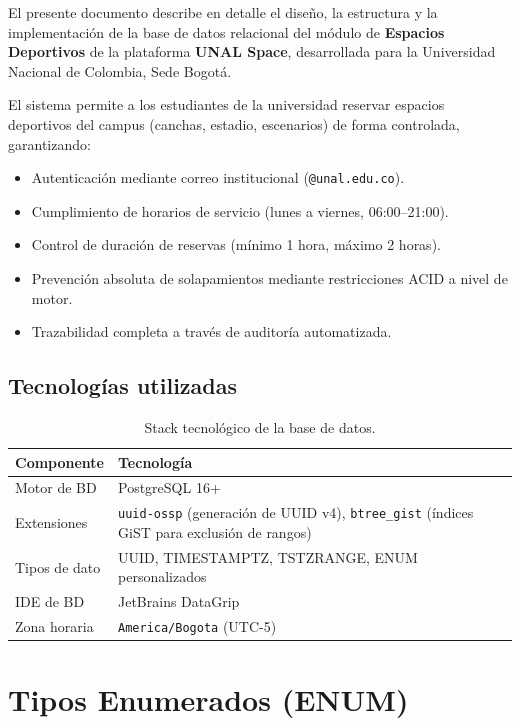 \documentclass[12pt, a4paper]{article}
\begin{document}
El presente documento describe en detalle el diseño, la estructura y la implementación de la base de datos relacional del módulo de \textbf{Espacios Deportivos} de la plataforma \textbf{UNAL Space}, desarrollada para la Universidad Nacional de Colombia, Sede Bogotá.

El sistema permite a los estudiantes de la universidad reservar espacios deportivos del campus (canchas, estadio, escenarios) de forma controlada, garantizando:

\begin{itemize}[leftmargin=2em]
    \item Autenticación mediante correo institucional (\texttt{@unal.edu.co}).
    \item Cumplimiento de horarios de servicio (lunes a viernes, 06:00--21:00).
    \item Control de duración de reservas (mínimo 1 hora, máximo 2 horas).
    \item Prevención absoluta de solapamientos mediante restricciones ACID a nivel de motor.
    \item Trazabilidad completa a través de auditoría automatizada.
\end{itemize}

\subsection{Tecnologías utilizadas}

\begin{table}[H]
\centering
\begin{tabular}{lp{10cm}}
    \toprule
    \textbf{Componente} & \textbf{Tecnología} \\
    \midrule
    Motor de BD & PostgreSQL 16+ \\
    Extensiones & \texttt{uuid-ossp} (generación de UUID v4), \texttt{btree\_gist} (índices GiST para exclusión de rangos) \\
    Tipos de dato & UUID, TIMESTAMPTZ, TSTZRANGE, ENUM personalizados \\
    IDE de BD & JetBrains DataGrip \\
    Zona horaria & \texttt{America/Bogota} (UTC-5) \\
    \bottomrule
\end{tabular}
\caption{Stack tecnológico de la base de datos.}
\end{table}


\section{Tipos Enumerados (ENUM)}
\end{document}
